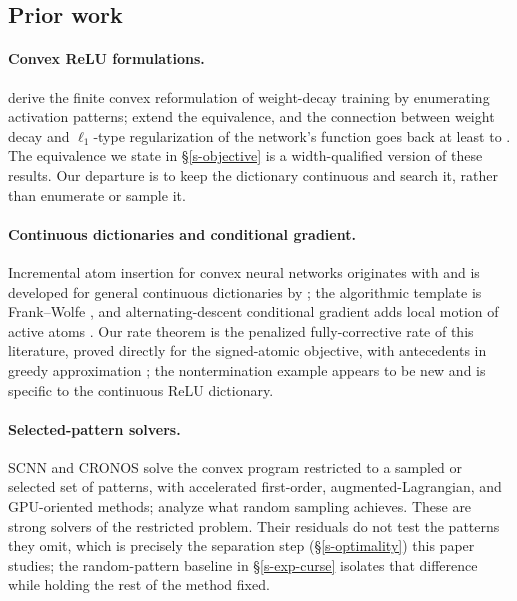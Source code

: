 \documentclass[12pt]{article}
\theoremstyle{plain}
\theoremstyle{definition}
\begin{document}
\subsection{Prior work}\label{s-prior}

\paragraph{Convex ReLU formulations.}
\citet{pilanci2020neural} derive the finite convex reformulation of
weight-decay training by enumerating activation patterns; \citet{ergen2021convex}
extend the equivalence, and the connection between weight decay and
$\ell_1$-type regularization of the network's function goes back at least to
\citet{neyshabur2015search,savarese2019infinite}. The equivalence we state in
\S\ref{s-objective} is a width-qualified version of these results. Our
departure is to keep the dictionary continuous and search it, rather than
enumerate or sample it.

\paragraph{Continuous dictionaries and conditional gradient.}
Incremental atom insertion for convex neural networks originates with
\citet{bengio2006convex} and is developed for general continuous dictionaries
by \citet{bach2017breaking}; the algorithmic template is Frank--Wolfe
\citep{frank1956algorithm,jaggi2013revisiting,clarkson2010coresets,
lacostejulien2015global}, and alternating-descent conditional gradient adds
local motion of active atoms \citep{boyd2017adcg,eftekhari2019equivalence}.
Our rate theorem is the penalized fully-corrective rate of this literature,
proved directly for the signed-atomic objective, with antecedents in greedy
approximation \citep{barron1993universal,clarkson2010coresets}; the
nontermination example appears to be new and is specific to the continuous
ReLU dictionary.

\paragraph{Selected-pattern solvers.}
SCNN \citep{mishkin2022fast} and CRONOS \citep{feng2024cronos} solve the
convex program restricted to a sampled or selected set of patterns, with
accelerated first-order, augmented-Lagrangian, and GPU-oriented methods;
\citet{kim2024sampling} analyze what random sampling achieves. These are
strong solvers of the restricted problem. Their residuals do not test the
patterns they omit, which is precisely the separation step
(\S\ref{s-optimality}) this paper studies; the random-pattern baseline in
\S\ref{s-exp-curse} isolates that difference while holding the rest of the
method fixed.
\end{document}
